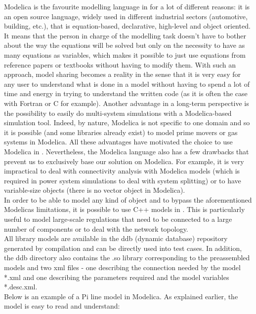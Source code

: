 \documentclass[a4paper, 12pt]{report}
\begin{document}
Modelica is the favourite modelling language in \Dynawo for a lot of different reasons: it is an open source language, widely used in different industrial sectors (automotive, building, etc.), that is equation-based, declarative, high-level and object oriented. It means that the person in charge of the modelling task doesn't have to bother about the way the equations will be solved but only on the necessity to have as many equations as variables, which makes it possible to just use equations from reference papers or textbooks without having to modify them. With such an approach, model sharing becomes a reality in the sense that it is very easy for any user to understand what is done in a model without having to spend a lot of time and energy in trying to understand the written code (as it is often the case with Fortran or C for example). Another advantage in a long-term perspective is the possibility to easily do multi-system simulations with a Modelica-based simulation tool. Indeed, by nature, Modelica is not specific to one domain and so it is possible (and some libraries already exist) to model prime movers or gas systems in Modelica. All these advantages have motivated the choice to use Modelica in \Dynawo. Nevertheless, the Modelica language also has a few drawbacks that prevent us to exclusively base our solution on Modelica. For example, it is very impractical to deal with connectivity analysis with Modelica models (which is required in power system simulations to deal with system splitting) or to have variable-size objects (there is no vector object in Modelica). \\

In order to be able to model any kind of object and to bypass the aforementioned Modelica\textquotesingle s limitations, it is possible to use C++ models in \Dynawo. This is particularly useful to model large-scale regulations that need to be connected to a large number of components or to deal with the network topology. \\

All library models are available in the ddb (dynamic database) repository generated by \Dynawo compilation and can be directly used into test cases. In addition, the ddb directory also contains the .so library corresponding to the preassembled models and two xml files - one describing the connection needed by the model *.xml and one describing the parameters required and the model variables *.desc.xml.  \\

Below is an example of a Pi line model in Modelica. As explained earlier, the model is easy to read and understand:
\end{document}
